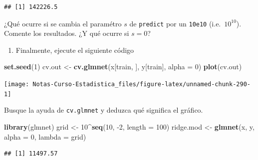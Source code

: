 \documentclass[
  12pt,
]{book}
\newenvironment{Shaded}{\begin{snugshade}}{\end{snugshade}}
\newcommand{\DataTypeTok}[1]{\textcolor[rgb]{0.13,0.29,0.53}{#1}}
\newcommand{\DecValTok}[1]{\textcolor[rgb]{0.00,0.00,0.81}{#1}}
\newcommand{\KeywordTok}[1]{\textcolor[rgb]{0.13,0.29,0.53}{\textbf{#1}}}
\newcommand{\NormalTok}[1]{#1}
\newcommand{\OperatorTok}[1]{\textcolor[rgb]{0.81,0.36,0.00}{\textbf{#1}}}
\newcommand{\StringTok}[1]{\textcolor[rgb]{0.31,0.60,0.02}{#1}}
\providecommand{\tightlist}{%
  \setlength{\itemsep}{0pt}\setlength{\parskip}{0pt}}
\theoremstyle{definition}
\theoremstyle{definition}
\theoremstyle{definition}
\theoremstyle{remark}
\begin{document}
\begin{verbatim}
## [1] 142226.5
\end{verbatim}

¿Qué ocurre si se cambia el paramétro \(s\) de \texttt{predict} por un \texttt{10e10} (i.e.~\(10^{10}\)). Comente los resultados. ¿Y qué ocurre si \(s=0\)?

\begin{enumerate}
\def\labelenumi{\arabic{enumi}.}
\setcounter{enumi}{2}
\tightlist
\item
  Finalmente, ejecute el siguiente código
\end{enumerate}

\begin{Shaded}
\begin{Highlighting}[]
\KeywordTok{set.seed}\NormalTok{(}\DecValTok{1}\NormalTok{)}
\NormalTok{cv.out <-}\StringTok{ }\KeywordTok{cv.glmnet}\NormalTok{(x[train, ], y[train], }\DataTypeTok{alpha =} \DecValTok{0}\NormalTok{)}
\KeywordTok{plot}\NormalTok{(cv.out)}
\end{Highlighting}
\end{Shaded}

\begin{center}\texttt{[image: Notas-Curso-Estadistica\_files/figure-latex/unnamed-chunk-290-1]} \end{center}

Busque la ayuda de \texttt{cv.glmnet} y deduzca qué significa el gráfico.

\begin{Shaded}
\begin{Highlighting}[]
\KeywordTok{library}\NormalTok{(glmnet)}
\NormalTok{grid <-}\StringTok{ }\DecValTok{10}\OperatorTok{^}\KeywordTok{seq}\NormalTok{(}\DecValTok{10}\NormalTok{, }\DecValTok{-2}\NormalTok{, }\DataTypeTok{length =} \DecValTok{100}\NormalTok{)}
\NormalTok{ridge.mod <-}\StringTok{ }\KeywordTok{glmnet}\NormalTok{(x, y, }\DataTypeTok{alpha =} \DecValTok{0}\NormalTok{, }\DataTypeTok{lambda =}\NormalTok{ grid)}
\end{Highlighting}
\end{Shaded}

\begin{Shaded}
\end{Shaded}

\begin{verbatim}
## [1] 11497.57
\end{verbatim}
\end{document}
